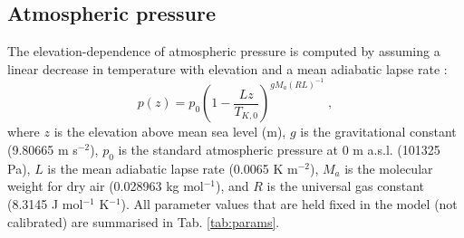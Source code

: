 \documentclass[gmd, manuscript]{copernicus}
\begin{document}

\subsection{Atmospheric pressure}
\label{sec:press}
The elevation-dependence of atmospheric pressure is computed by assuming a linear decrease in temperature with elevation and a mean adiabatic lapse rate \citep{berberan97}:
\begin{equation}
\label{eq:pz}
    p(z) = p_0 \left( 
      1 - \frac{L z}{T_{K,0}} 
    \right)^{g M_a (R L)^{-1}} \;,
\end{equation} 
where $z$ is the elevation above mean sea level (m), $g$ is the gravitational constant (9.80665 m s$^{-2}$), $p_0$ is the standard atmospheric pressure at 0 m a.s.l. (101325 Pa), $L$ is the mean adiabatic lapse rate (0.0065 K m$^{-2}$), $M_a$ is the molecular weight for dry air (0.028963 kg mol$^{-1}$), and $R$ is the universal gas constant (8.3145 J mol$^{-1}$ K$^{-1}$). All parameter values that are held fixed in the model (not calibrated) are summarised in Tab. \ref{tab:params}.
\end{document}
